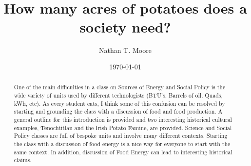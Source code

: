 \documentclass[prb,preprint]{revtex4-2}
\begin{document}
\title{How many acres of potatoes does a society need?} 

\author{Nathan T. Moore}

\date{\today}

\begin{abstract}
One of the main difficulties in a class on Sources of Energy and Social Policy is the wide variety of units used by different technologists (BTU's, Barrels of oil, Quads, kWh, etc).  As every student eats, I think some of this confusion can be resolved by starting and grounding the class with a discussion of food and food production.  A general outline for this introduction is provided and two interesting historical cultural examples, Tenochtitlan and the Irish Potato Famine, are provided.  
Science and Social Policy classes are full of bespoke units and involve many different contexts.  Starting the class with a discussion of food energy is a nice way for everyone to start with the same context.  In addition, discussion of Food Energy can lead to interesting historical claims. 
\end{abstract}
\maketitle
\end{document}
